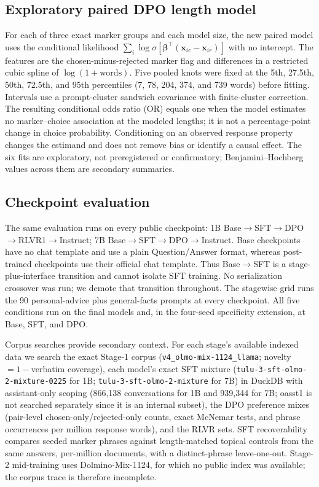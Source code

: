 \documentclass[11pt]{article}
\begin{document}
\subsection{Exploratory paired DPO length model}
\label{sec:method-dpo-conditional}
For each of three exact marker groups and each model size, the new paired model
uses the conditional likelihood $\sum_i\log\sigma[\boldsymbol\beta^\top
(\mathbf{x}_{ic}-\mathbf{x}_{ir})]$ with no intercept. The features are the
chosen-minus-rejected marker flag and differences in a restricted cubic spline
of $\log(1+\text{words})$. Five pooled knots were fixed at the 5th, 27.5th,
50th, 72.5th, and 95th percentiles (7, 78, 204, 374, and 739 words) before
fitting. Intervals use a prompt-cluster sandwich covariance with finite-cluster
correction. The resulting conditional odds ratio (OR) equals one when the model
estimates no marker--choice association at the modeled lengths; it is not a
percentage-point change in choice probability. Conditioning on an observed
response property changes the estimand and does not remove bias or identify a
causal effect. The six fits are exploratory, not preregistered or confirmatory;
Benjamini--Hochberg values across them are secondary summaries.

\subsection{Checkpoint evaluation}
\label{sec:method-stagewise}
The same evaluation runs on every public checkpoint: 1B
Base$\to$SFT$\to$DPO$\to$RLVR1$\to$Instruct; 7B
Base$\to$SFT$\to$DPO$\to$Instruct. Base checkpoints have no chat template and
use a plain Question/Answer format, whereas post-trained checkpoints use their
official chat template. Thus Base$\to$SFT is a stage-plus-interface
transition and cannot isolate SFT training. No serialization crossover was run;
we demote that transition throughout. The
stagewise grid runs the 90 personal-advice plus general-facts prompts at every checkpoint. All five
conditions run on the final models and, in the four-seed specificity extension,
at Base, SFT, and DPO.

Corpus searches provide secondary context. For each stage's available indexed data
we search the exact Stage-1 corpus
(\texttt{v4\_olmo-mix-1124\_llama}; novelty $=1-$verbatim coverage), each
model's exact SFT mixture (\texttt{tulu-3-sft-olmo-2-mixture-0225} for 1B;
\texttt{tulu-3-sft-olmo-2-mixture} for 7B) in DuckDB with assistant-only scoping
(866{,}138 conversations for 1B and 939{,}344 for 7B; oasst1 is not searched
separately since it is an internal subset), the DPO preference mixes
(pair-level chosen-only/rejected-only counts, exact McNemar tests, and phrase
occurrences per million response words), and the
RLVR sets. SFT recoverability compares seeded marker phrases against
length-matched topical controls from the same answers, per-million documents,
with a distinct-phrase leave-one-out. Stage-2 mid-training uses
Dolmino-Mix-1124, for which no public index was available; the corpus trace is
therefore incomplete.
\end{document}
